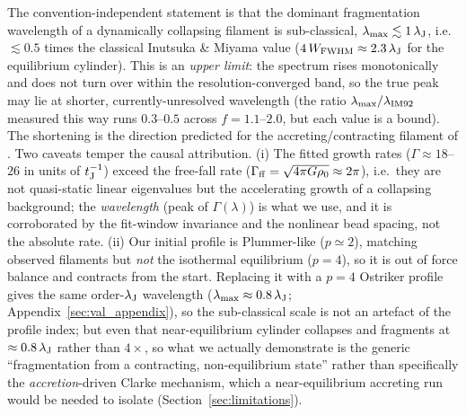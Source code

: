\documentclass[usenatbib,twoside,twocolumn]{mnras}
\begin{document}
The convention-independent statement is that the dominant fragmentation wavelength of a dynamically collapsing filament is sub-classical, $\lambda_{\rm max}\lesssim1\,\lambda_{\rm J}$, i.e.\ $\lesssim0.5$ times the classical Inutsuka \& Miyama value ($4\,W_{\rm FWHM}\approx2.3\,\lambda_{\rm J}$ for the equilibrium cylinder). This is an \emph{upper limit}: the spectrum rises monotonically and does not turn over within the resolution-converged band, so the true peak may lie at shorter, currently-unresolved wavelength (the ratio $\lambda_{\rm max}/\lambda_{\rm IM92}$ measured this way runs $0.3$--$0.5$ across $f=1.1$--$2.0$, but each value is a bound). The shortening is the direction predicted for the accreting/contracting filament of \citet{Clarke2016,Clarke2017}. Two caveats temper the causal attribution. (i) The fitted growth rates ($\Gamma\approx18$--$26$ in units of $t_{\rm J}^{-1}$) exceed the free-fall rate ($\Gamma_{\rm ff}=\sqrt{4\pi G\rho_0}\approx2\pi$), i.e.\ they are not quasi-static linear eigenvalues but the accelerating growth of a collapsing background; the \emph{wavelength} (peak of $\Gamma(\lambda)$) is what we use, and it is corroborated by the fit-window invariance and the nonlinear bead spacing, not the absolute rate. (ii) Our initial profile is Plummer-like ($p\simeq2$), matching observed filaments but \emph{not} the isothermal equilibrium ($p=4$), so it is out of force balance and contracts from the start. Replacing it with a $p=4$ Ostriker profile gives the same order-$\lambda_{\rm J}$ wavelength ($\lambda_{\rm max}\approx0.8\,\lambda_{\rm J}$; Appendix~\ref{sec:val_appendix}), so the sub-classical scale is not an artefact of the profile index; but even that near-equilibrium cylinder collapses and fragments at $\approx0.8\,\lambda_{\rm J}$ rather than $4\times$, so what we actually demonstrate is the generic ``fragmentation from a contracting, non-equilibrium state'' rather than specifically the \emph{accretion}-driven Clarke mechanism, which a near-equilibrium accreting run would be needed to isolate (Section~\ref{sec:limitations}).
\end{document}
